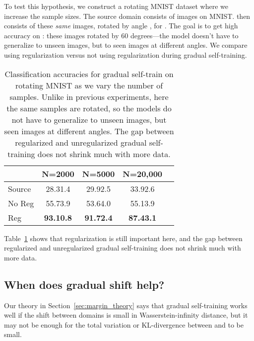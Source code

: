 \documentclass[11pt]{article}
\newcommand{\tnote}[1]{}
\newcommand{\pl}[1]{}
\newcommand{\ak}[1]{}
\begin{document}
To test this hypothesis, we construct a rotating MNIST dataset where we increase the sample sizes.
The source domain  consists of  images on MNIST.
 then consists of these \emph{same}  images, rotated by angle , for .
The goal is to get high accuracy on : these images rotated by 60 degrees---the model doesn't have to generalize to unseen images, but to seen images at different angles.
We compare using regularization versus not using regularization during gradual self-training.
\begin{table}[t]
\caption{
Classification accuracies for gradual self-train on rotating MNIST as we vary the number of samples.
Unlike in previous experiments, here the same  samples are rotated, so the models do not have to generalize to unseen images, but seen images at different angles.
The gap between regularized and unregularized gradual self-training does not shrink much with more data.
}
\label{tab:moreDataDoesntHelp}
\vskip 0.15in
\begin{center}
\begin{small}
\begin{sc}
\begin{tabular}{lcccr}
\toprule
 & N=2000 & N=5000 & N=20,000 \\
\midrule
Source         & 28.31.4  & 29.92.5 & 33.92.6\\
No Reg   & 55.73.9  & 53.64.0 & 55.13.9\\
Reg           & \textbf{93.10.8}  & \textbf{91.72.4} & \textbf{87.43.1}\\
\bottomrule
\end{tabular}
\end{sc}
\end{small}
\end{center}
\vskip -0.1in
\end{table}
Table~\ref{tab:moreDataDoesntHelp} shows that regularization is still important here, and the gap between regularized and unregularized gradual self-training does not shrink much with more data.

\pl{one could just say maybe your  is too small, and if you had a million points, then it wouldn't matter...}
\ak{True, I added an experiment with 20K points.}

\subsection{When does gradual shift help? \tnote{can we have a statement instead of a question?}}

Our theory in Section~\ref{sec:margin_theory} says that gradual self-training works well if the shift between domains is small in Wasserstein-infinity distance, but it may not be enough for the total variation or KL-divergence between  and  to be small.
\end{document}
